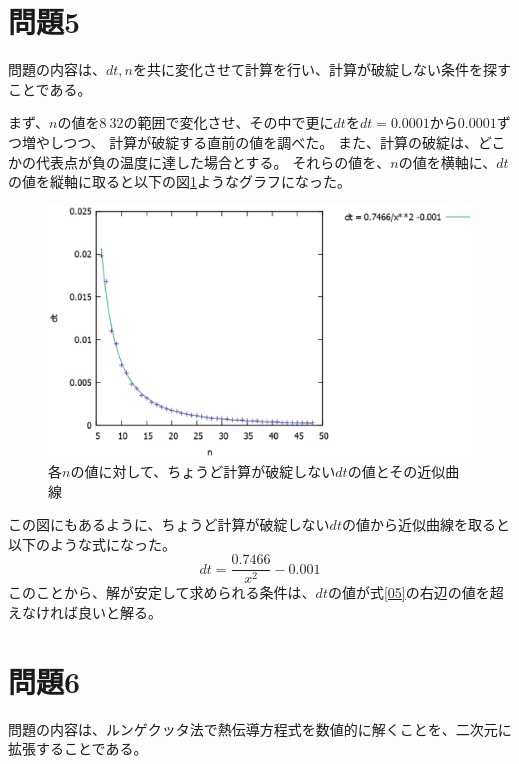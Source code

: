 \documentclass{jsarticle}
\begin{document}
\section{問題5}
問題の内容は、$dt,n$を共に変化させて計算を行い、計算が破綻しない条件を探すことである。

まず、$n$の値を$8~32$の範囲で変化させ、その中で更に$dt$を$dt=0.0001$から$0.0001$ずつ増やしつつ、
計算が破綻する直前の値を調べた。
また、計算の破綻は、どこかの代表点が負の温度に達した場合とする。
それらの値を、$n$の値を横軸に、$dt$の値を縦軸に取ると以下の図\ref{fig05}ようなグラフになった。
\begin{figure}[H]
	\centering
	\includegraphics[width=14cm]{pic08.eps}
	\caption{各$n$の値に対して、ちょうど計算が破綻しない$dt$の値とその近似曲線}
	\label{fig05}
\end{figure}
この図にもあるように、ちょうど計算が破綻しない$dt$の値から近似曲線を取ると以下のような式になった。
\begin{equation}
	dt = \frac{0.7466}{x^2} - 0.001	\label{05}
\end{equation}
このことから、解が安定して求められる条件は、$dt$の値が式\ref{05}の右辺の値を超えなければ良いと解る。

\section{問題6}
問題の内容は、ルンゲクッタ法で熱伝導方程式を数値的に解くことを、二次元に拡張することである。
\end{document}
